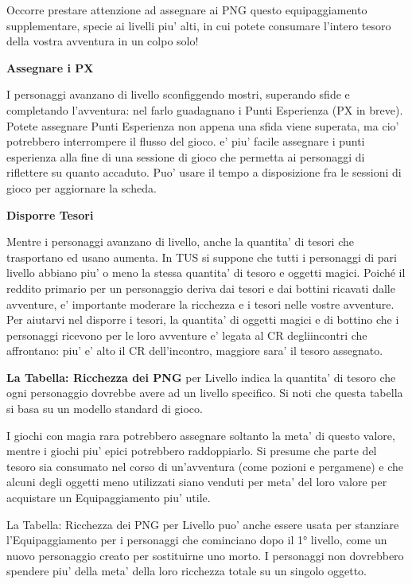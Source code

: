 \documentclass[a4paper,11pt,twoside,openany]{book}
\begin{document}
{		Occorre prestare attenzione ad assegnare ai PNG questo equipaggiamento supplementare, specie ai livelli piu' alti, in cui potete consumare l'intero tesoro della vostra avventura in un colpo solo!
		
		\textbf{Assegnare i PX}
		
		I personaggi avanzano di livello sconfiggendo mostri, superando sfide e completando l'avventura: nel farlo guadagnano i Punti Esperienza (PX in breve). Potete assegnare Punti Esperienza non appena una sfida viene superata, ma cio' potrebbero interrompere il flusso del gioco. e' piu' facile assegnare i punti esperienza alla fine di una sessione di gioco che permetta ai personaggi di riflettere su quanto accaduto. Puo' usare il tempo a disposizione fra le sessioni di gioco per aggiornare la scheda.
		
		\textbf{Disporre Tesori}
		
		Mentre i personaggi avanzano di livello, anche la quantita' di tesori che trasportano ed usano aumenta. In TUS si suppone che tutti i personaggi di pari livello abbiano piu' o meno la stessa quantita' di tesoro e oggetti magici. Poiché il reddito primario per un personaggio deriva dai tesori e dai bottini ricavati dalle avventure, e' importante moderare la ricchezza e i tesori nelle vostre avventure. Per aiutarvi nel disporre i tesori, la quantita' di oggetti magici e di bottino che i personaggi ricevono per le loro avventure e' legata al CR degliincontri che affrontano: piu' e' alto il CR dell'incontro, maggiore sara' il tesoro assegnato.
		
		\textbf{La Tabella: Ricchezza dei PNG} per Livello indica la quantita' di tesoro che ogni personaggio dovrebbe avere ad un livello specifico. Si noti che questa tabella si basa su un modello standard di gioco.
		
		I giochi con magia rara potrebbero assegnare soltanto la meta' di questo valore, mentre i giochi piu' epici potrebbero raddoppiarlo. Si presume che parte del tesoro sia consumato nel corso di un'avventura (come pozioni e pergamene) e che alcuni degli oggetti meno utilizzati siano venduti per meta' del loro valore per acquistare un Equipaggiamento piu' utile.
		
		La Tabella: Ricchezza dei PNG per Livello puo' anche essere usata per stanziare l'Equipaggiamento per i personaggi che cominciano dopo il 1° livello, come un nuovo personaggio creato per sostituirne uno morto. I personaggi non dovrebbero spendere piu' della meta' della loro ricchezza totale su un singolo oggetto.
		
}
\end{document}

